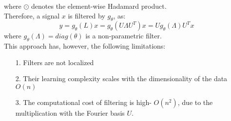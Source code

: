 where $\odot$ denotes the element-wise Hadamard product.\\
Therefore, a signal $x$ is filtered by $g_{\theta}$, as:\\
\begin{equation}
y = g_{\theta}(L)x = g_{\theta} (U\Lambda U^T)x = U g_{\theta}(\Lambda ) U^T x
\end{equation}
where $g_{\theta}(\Lambda) = diag(\theta)$ is a non-parametric filter.\\
This approach has, however, the following limitations:
\begin{itemize}
\item [1.] Filters are not localized
\item [2.] Their learning complexity scales with the dimensionality of the data $O(n)$
\item [3.] The computational cost of filtering is high- $O(n^2)$, due to the
multiplication with the Fourier basis $U$.
\end{itemize}

